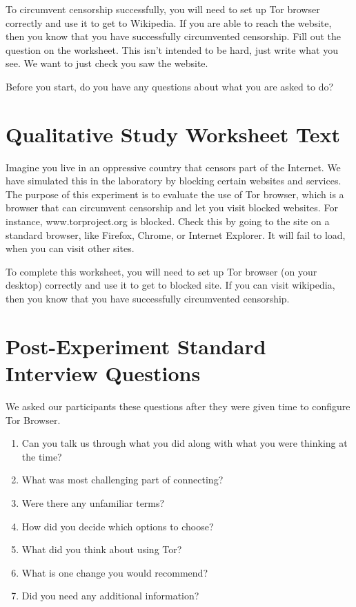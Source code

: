 \documentclass[USenglish,oneside,twocolumn]{article}
\begin{document}
To circumvent censorship successfully, you will need to set up Tor browser correctly and use it to get to Wikipedia. If you are able to reach the website, then you know that you have successfully circumvented censorship. Fill out the question on the worksheet. This isn't intended to be hard, just write what you see. We want to just check you saw the website. 

Before you start, do you have any questions about what you are asked to do? 

\section{Qualitative Study Worksheet Text} 
\label{participant-worksheet}
Imagine you live in an oppressive country that censors part of the Internet. We have simulated this in the laboratory by blocking certain websites and services. The purpose of this experiment is to evaluate the use of Tor browser, which is a browser that can circumvent censorship and let you visit blocked websites. For instance, www.torproject.org is blocked. Check this by going to the site on a standard browser, like Firefox, Chrome, or Internet Explorer. It will fail to load, when you can visit other sites.

To complete this worksheet, you will need to set up Tor browser (on your desktop) correctly and use it to get to blocked site. If you can visit wikipedia, then you know that you have successfully circumvented censorship.

\section{Post-Experiment Standard Interview Questions}
\label{interview-questions}
We asked our participants these questions after they were given time to configure Tor Browser. \\

\begin{enumerate}
\item{Can you talk us through what you did along with what you were thinking at the time?}
\item{What was most challenging part of connecting?}
\item{Were there any unfamiliar terms?}
\item{How did you decide which options to choose?}
\item{What did you think about using Tor?}
\item{What is one change you would recommend?} 
\item{Did you need any additional information?} 
\end{enumerate}  
\end{document}
